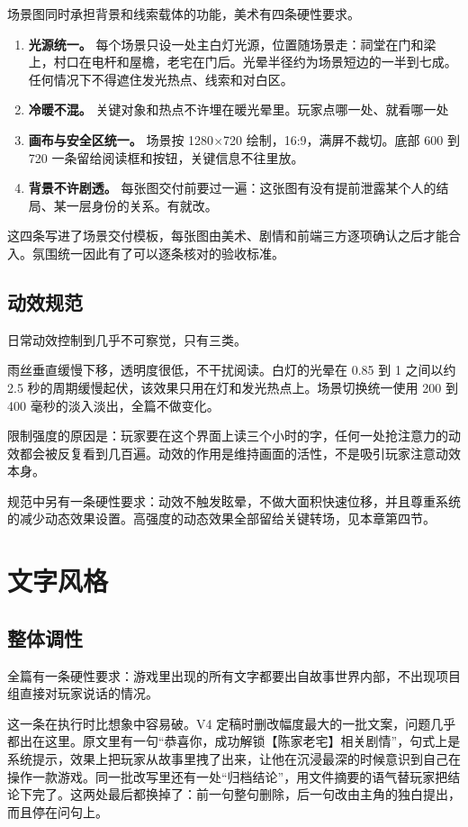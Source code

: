 场景图同时承担背景和线索载体的功能，美术有四条硬性要求。

\begin{enumerate}
  \item \textbf{光源统一。} 每个场景只设一处主白灯光源，位置随场景走：祠堂在门和梁上，村口在电杆和屋檐，老宅在门后。光晕半径约为场景短边的一半到七成。任何情况下不得遮住发光热点、线索和对白区。
  \item \textbf{冷暖不混。} 关键对象和热点不许埋在暖光晕里。玩家点哪一处、就看哪一处
  \item \textbf{画布与安全区统一。} 场景按 1280$\times$720 绘制，16:9，满屏不裁切。底部 600 到 720 一条留给阅读框和按钮，关键信息不往里放。
  \item \textbf{背景不许剧透。} 每张图交付前要过一遍：这张图有没有提前泄露某个人的结局、某一层身份的关系。有就改。
\end{enumerate}

这四条写进了场景交付模板，每张图由美术、剧情和前端三方逐项确认之后才能合入。氛围统一因此有了可以逐条核对的验收标准。

\subsection{动效规范}

日常动效控制到几乎不可察觉，只有三类。

雨丝垂直缓慢下移，透明度很低，不干扰阅读。白灯的光晕在 0.85 到 1 之间以约 2.5 秒的周期缓慢起伏，该效果只用在灯和发光热点上。场景切换统一使用 200 到 400 毫秒的淡入淡出，全篇不做变化。

限制强度的原因是：玩家要在这个界面上读三个小时的字，任何一处抢注意力的动效都会被反复看到几百遍。动效的作用是维持画面的活性，不是吸引玩家注意动效本身。

规范中另有一条硬性要求：动效不触发眩晕，不做大面积快速位移，并且尊重系统的减少动态效果设置。高强度的动态效果全部留给关键转场，见本章第四节。

\section{文字风格}

\subsection{整体调性}

全篇有一条硬性要求：游戏里出现的所有文字都要出自故事世界内部，不出现项目组直接对玩家说话的情况。

这一条在执行时比想象中容易破。V4 定稿时删改幅度最大的一批文案，问题几乎都出在这里。原文里有一句“恭喜你，成功解锁【陈家老宅】相关剧情”，句式上是系统提示，效果上把玩家从故事里拽了出来，让他在沉浸最深的时候意识到自己在操作一款游戏。同一批改写里还有一处“归档结论”，用文件摘要的语气替玩家把结论下完了。这两处最后都换掉了：前一句整句删除，后一句改由主角的独白提出，而且停在问句上。

